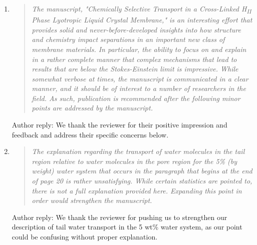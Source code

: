 \documentclass{article}
\begin{document}
\begin{enumerate}
	
    \item \begin{quote} \textit{The manuscript, "Chemically Selective Transport 
    in a Cross-Linked H\textsubscript{II} Phase Lyotropic Liquid Crystal Membrane,"
    is an interesting effort that provides solid and never-before-developed insights
    into how structure and chemistry impact separations in an important new class of
    membrane materials. In particular, the ability to focus on and explain in a 
    rather complete manner that complex mechanisms that lead to results that are 
    below the Stokes-Einstein limit is impressive.  While somewhat verbose at times, 
    the manuscript is communicated in a clear manner, and it should be of interest 
    to a number of researchers in the field. As such, publication is recommended after
    the following minor points are addressed by the manuscript.} 
    \end{quote}
	
    Author reply: We thank the reviewer for their positive impression and feedback 
    and address their specific concerns below. 
	
    \item \begin{quote}
    \textit{The explanation regarding the transport of water molecules in the tail 
    region relative to water molecules in the pore region for the 5\% (by weight) 
    water system that occurs in the paragraph that begins at the end of page 20 is
    rather unsatisfying. While certain statistics are pointed to, there is not a 
    full explanation provided here. Expanding this point in order would strengthen
    the manuscript.}
    \end{quote}

    Author reply: We thank the reviewer for pushing us to strengthen our description
    of tail water transport in the 5 wt\% water system, as our point could be 
    confusing without proper explanation.
    

\end{enumerate}
\end{document}
